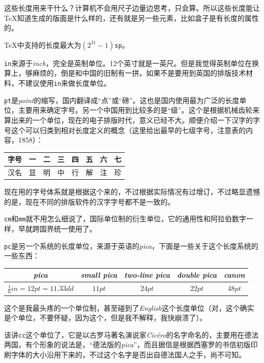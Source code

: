 \documentclass{article}
\begin{document}
这些长度用来干什么？计算机不会用尺子边量边思考，只会算。所以这些长度能让\TeX 知道生成的版面是什么样的，还有就是另一些元素，比如盒子是有长度的属性的。

\TeX 中支持的长度最大为$(2^{31}-1)$\verb!sp!。

\verb!in!来源于\textit{inch}，完全是英制单位。12个英寸就是一英尺。但是我觉得英制单位在换算上，够麻烦的，倒是和中国的旧制有一拼。如果不是要用到英国的排版技术材料，不建议使用\verb!in!来做长度单位。

\verb!pt!是\textit{point}的缩写，国内翻译成“点”或“磅”。这也是国内使用最为广泛的长度单位，主要用来确定字号。另一个中国用到比较多的是“级”。这个是根据机械齿轮来算出来的一个单位，现在的电子排版时代，意义已经不大。顺便介绍一下汉字的字号这个可以归类到相对长度定义的概念（这里给出最早的七级字号，注意表的内容，1858）：
\begin{table}[!ht]
\begin{center}
\begin{tabular}{llllllll}
\hline
字号&一&二&三&四&五&六&七\\
\hline
汉名&显&明&中&行&解&注&珍\\
\hline
\end{tabular}
\end{center}
\end{table}
现在用的字号体系就是根据这个来的，不过根据实际情况有过增订，不过略显遗憾的是，现在不同的排版软件的汉字字号都不是一致的。

\verb!cm!和\verb!mm!就不用怎么细说了，国际单位制的衍生单位，它的通用性和阿拉伯数字一样，早就跨国界统一使用了。

\verb!pc!是另一个系统的长度单位，来源于英语的\textit{pica}，下面是一些关于这个长度系统的一些东西：
\begin{table}[!ht]
\begin{center}
\begin{tabular}{ccccc}
\hline
\textit{pica}&\textit{small pica}&\textit{two-line pica}&\textit{double pica}&\textit{canon}\\
\hline
$\frac{1}{6}in=12pt=11.33dd$&$11pt$&$24pt$&$22pt$&$48pt$\\
\hline
\end{tabular}
\end{center}
\end{table}
这个是我最头疼的一个单位制，甚至碰到了\textit{English}这个长度单位（对，这个确实是个单位，不要怀疑，因为这个，但是我不解释，我快崩溃了）。

该讲\verb!cc!这个单位了，它是以古罗马著名演说家\textit{Cicéro}的名字命名的，主要用在德法两国，有个形象的说法是，“德法版的\textit{pica}”，而且据信是根据西塞罗的书信初版印刷字体的大小沿用下来的，不过这个名字是否出自德法国人之手，尚不可知。
\end{document}
